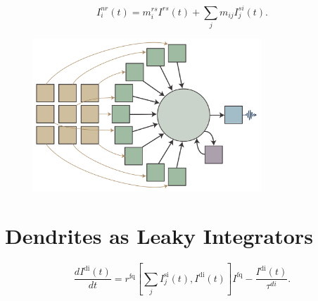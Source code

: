 \documentclass[twocolumn]{article}
\begin{document}

\begin{equation}
\label{eq:I_nr__with_refraction}
I_i^{nr}(t) = m_i^{rs}I^{rs}(t)+\sum_j m_{ij} I_j^{si}(t).
\end{equation}

\begin{figure}[htb]
\includegraphics[width=8.6cm]{figures/_06__point_neuron__nine_pixel_schematic.pdf}
\end{figure}
 

\section{\label{sec:dendrites}Dendrites as Leaky Integrators}

\begin{equation}
\label{eq:leaky_integrator__SI_loop}
\frac{dI^{\mathrm{di}}(t)}{dt} = r^{\mathrm{fq}}\left[\sum_j I^{\mathrm{si}}_{j}(t),I^{\mathrm{di}}(t)\right] I^{\mathrm{fq}}-\frac{I^{\mathrm{di}}(t)}{\tau^{di}}.
\end{equation}

% 
\end{document}
